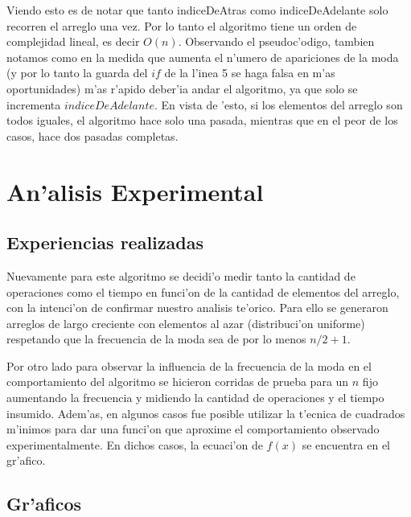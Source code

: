 Viendo esto es de notar que tanto indiceDeAtras como indiceDeAdelante solo recorren el arreglo una vez. 
Por lo tanto el algoritmo tiene un orden de complejidad lineal, es decir $O(n)$.
Observando el pseudoc'odigo, tambien notamos como en la medida que aumenta el n'umero de apariciones de la 
moda (y por lo tanto la guarda del $if$ de la l'inea 5 se haga falsa en m'as oportunidades) m'as r'apido 
deber'ia andar el algoritmo, ya que solo se incrementa $indiceDeAdelante$. En vista de 'esto, si los elementos 
del arreglo son todos iguales, el algoritmo hace solo una pasada, mientras que en el peor de los casos, 
hace dos pasadas completas.

\section{An'alisis Experimental}
\subsection{Experiencias realizadas}
Nuevamente para este algoritmo se decidi'o medir tanto la cantidad de operaciones como el tiempo en funci'on de la cantidad de 
elementos del arreglo, con la intenci'on de confirmar nuestro analisis te'orico. Para ello se generaron arreglos de largo creciente 
con elementos al azar (distribuci'on uniforme) respetando que la frecuencia de la moda sea de por lo menos $n/2+1$.

Por otro lado para observar la influencia de la frecuencia de la moda en el comportamiento del algoritmo se hicieron corridas de prueba
para un $n$ fijo aumentando la frecuencia y midiendo la cantidad de operaciones y el tiempo insumido.
Adem'as, en algunos casos fue posible utilizar la t'ecnica de cuadrados m'inimos para dar una funci'on 
que aproxime el comportamiento observado experimentalmente. En dichos casos, la ecuaci'on de $f(x)$ se encuentra en el gr'afico.

\subsection{Gr'aficos}

